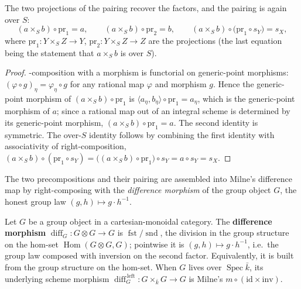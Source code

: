 \begin{lemma}\label{mk-lem:rationalMap_prod_proj}
  \leanok

  The two projections of the pairing recover the factors, and the pairing is again over
  \(S\):
  \[
    (a \times_S b) \circ \mathrm{pr}_1 = a,
    \qquad
    (a \times_S b) \circ \mathrm{pr}_2 = b,
    \qquad
    (a \times_S b) \circ \bigl(\mathrm{pr}_1 \circ s_Y\bigr) = s_X,
  \]
  where \(\mathrm{pr}_1 \colon Y \times_S Z \to Y\), \(\mathrm{pr}_2 \colon Y \times_S Z \to Z\)
  are the projections (the last equation being the statement that \(a \times_S b\) is over
  \(S\)).
\end{lemma}
\begin{proof}
  \leanokRight-composition with a morphism is functorial on generic-point morphisms:
  \((\varphi \circ g)_\eta = \varphi_\eta \circ g\) for any rational map \(\varphi\) and
  morphism \(g\). Hence the generic-point morphism of \((a \times_S b) \circ \mathrm{pr}_1\) is
  \(\langle a_\eta, b_\eta\rangle \circ \mathrm{pr}_1 = a_\eta\), which is the generic-point
  morphism of \(a\); since a rational map out of an integral scheme is determined by its
  generic-point morphism, \((a \times_S b) \circ \mathrm{pr}_1 = a\). The second identity is
  symmetric. The over-\(S\) identity follows by combining the first identity with
  associativity of right-composition, \((a \times_S b) \circ (\mathrm{pr}_1 \circ s_Y) =
  \bigl((a \times_S b) \circ \mathrm{pr}_1\bigr) \circ s_Y = a \circ s_Y = s_X\).
\end{proof}

The two precompositions and their pairing are assembled into Milne's difference map by
right-composing with the \emph{difference morphism} of the group object \(G\), the honest
group law \((g,h) \mapsto g \cdot h^{-1}\).

\begin{definition}\label{mk-def:grpObj_diff}
  \leanok

  Let \(G\) be a group object in a cartesian-monoidal category. The \textbf{difference
  morphism} \(\operatorname{diff}_G \colon G \otimes G \to G\) is
  \(\operatorname{fst} / \operatorname{snd}\), the division in the group structure on the
  hom-set \(\operatorname{Hom}(G \otimes G, G)\); pointwise it is
  \((g,h) \mapsto g \cdot h^{-1}\), i.e.\ the group law composed with inversion on the second
  factor. Equivalently, it is built from the group structure on the hom-set. When \(G\)
  lives over \(\operatorname{Spec}\bar k\), its underlying scheme morphism
  \(\operatorname{diff}_G^{\,\mathrm{left}} \colon G \times_{\bar k} G \to G\) is Milne's
  \(m \circ (\mathrm{id} \times \mathrm{inv})\).
\end{definition}

